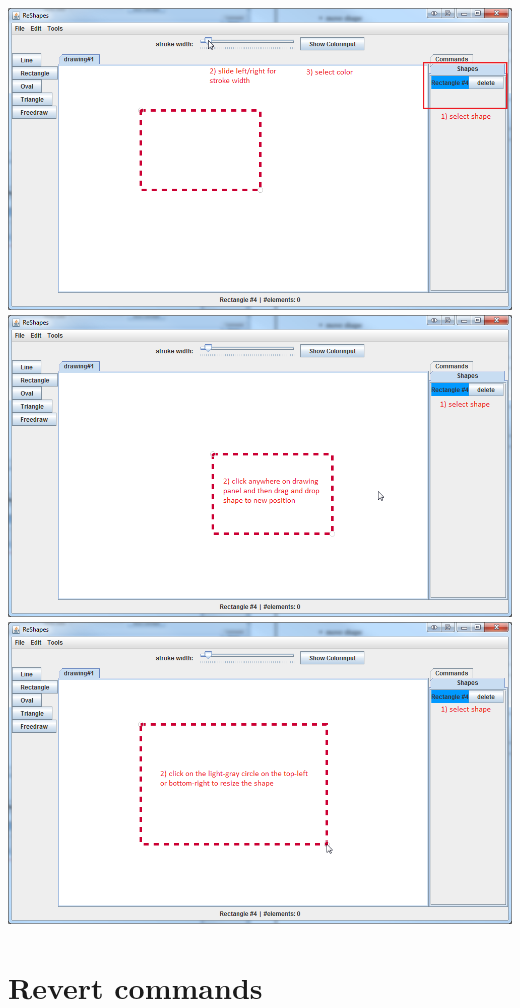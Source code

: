 \documentclass[12pt, accentcolor=tud9c, linedtoc, bigchapter, colorback, noresetcounter, numbersubsubsec]{tudreport}
\begin{document}
\includegraphics[width=1\textwidth]{img/set_stroke} \\
\includegraphics[width=1\textwidth]{img/move_shape} \\
\includegraphics[width=1\textwidth]{img/resize_shape}

\section{Revert commands}
\end{document}
